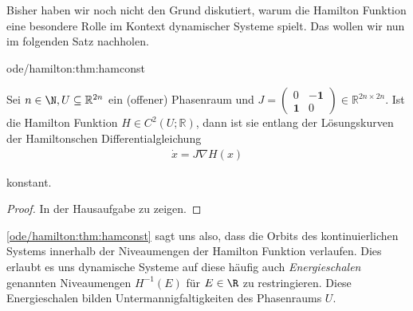 \documentclass[letterpaper,10pt,english]{jupyterBook}
\begin{document}
\par
Bisher haben wir noch nicht den Grund diskutiert, warum die Hamilton Funktion eine besondere Rolle im Kontext dynamischer Systeme spielt.
Das wollen wir nun im folgenden Satz nachholen.
\begin{theorem}{}{ode/hamilton:thm:hamconst}



\par
Sei \(n\in \N, U \subseteq \mathbb{R}^{2n}\) ein (offener) Phasenraum und \(J= \begin{pmatrix} 0 & - \mathbf{1} \\ \mathbf{1} & 0 \end{pmatrix} \in \mathbb{R}^{2n \times 2n}\).
Ist die Hamilton Funktion \(H \in C^2(U; \mathbb{R})\), dann ist sie entlang der Lösungskurven der Hamiltonschen Differentialgleichung
\begin{align*}
\dot x = J \nabla H(x)
\end{align*}
\par
konstant.
\end{theorem}

\begin{proof}
 In der Hausaufgabe zu zeigen.
\end{proof}

\par
\cref{ode/hamilton:thm:hamconst} sagt uns also, dass die Orbits des kontinuierlichen Systems innerhalb der Niveaumengen der Hamilton Funktion verlaufen.
Dies erlaubt es uns dynamische Systeme auf diese häufig auch \emph{Energieschalen} genannten Niveaumengen \(H^{-1}(E)\) für \(E \in \R\) zu restringieren.
Diese Energieschalen bilden Untermannigfaltigkeiten des Phasenraums \(U\).
\end{document}
